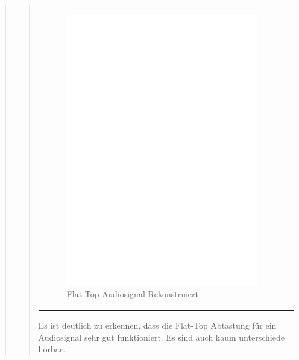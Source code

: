 \begin{quote}
\begin{quote}
\begin{center}
\begin{tabular}{ll}
                    \begin{minipage}{0.6\textwidth}
                        \begin{figure}[H]
                           \includegraphics[scale=0.55, trim = 16mm 70mm 16mm 85mm, clip]{Bilder/audioflat}
                           \caption{Flat-Top Audiosignal Rekonstruiert}
                          \label{fig:flataudio}
                        \end{figure}
                    \end{minipage}
                
                \end{tabular}
          \end{center}
          
          \vspace{2em}
          
          
          Es ist deutlich zu erkennen, dass die Flat-Top Abtastung für ein Audiosignal sehr gut funktioniert. Es sind
          auch kaum unterschiede hörbar.
          
      \end{quote}
      
      
\end{quote}










